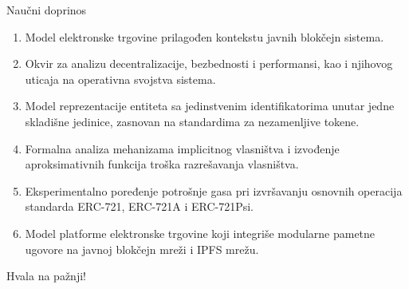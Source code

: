 \begin{frame}{Naučni doprinos}

\begin{enumerate}
\item {} Model elektronske trgovine prilagođen kontekstu javnih blokčejn sistema.
\item {} Okvir za analizu decentralizacije, bezbednosti i performansi, kao i njihovog uticaja na operativna svojstva sistema.
\item {} Model reprezentacije entiteta sa jedinstvenim identifikatorima unutar jedne skladišne jedinice, zasnovan na standardima za nezamenljive tokene.
\item {} Formalna analiza mehanizama implicitnog vlasništva i izvođenje aproksimativnih funkcija troška razrešavanja vlasništva.
\item {} Eksperimentalno poređenje potrošnje gasa pri izvršavanju osnovnih operacija standarda ERC-721, ERC-721A i ERC-721Psi.
\item {} Model platforme elektronske trgovine koji integriše modularne pametne ugovore na javnoj blokčejn mreži i IPFS mrežu.
\end{enumerate}

\end{frame}


\begin{frame}{}

\vspace{1.2cm}
\begin{center}
\Huge Hvala na pažnji!
\end{center}

\end{frame}

